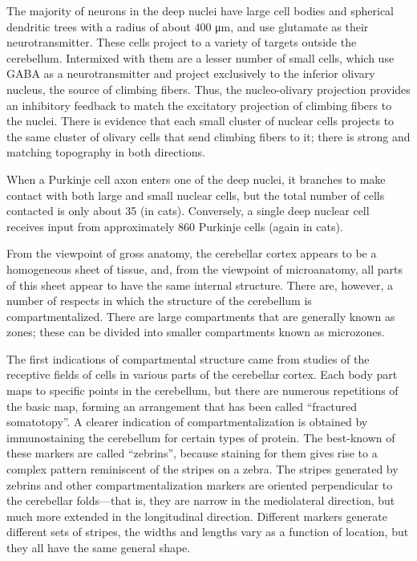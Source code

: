 \documentclass[]{book}
\begin{document}
The majority of neurons in the deep nuclei have large cell bodies and spherical dendritic trees with a radius of about 400 μm, and use glutamate as their neurotransmitter. These cells project to a variety of targets outside the cerebellum. Intermixed with them are a lesser number of small cells, which use GABA as a neurotransmitter and project exclusively to the inferior olivary nucleus, the source of climbing fibers. Thus, the nucleo-olivary projection provides an inhibitory feedback to match the excitatory projection of climbing fibers to the nuclei. There is evidence that each small cluster of nuclear cells projects to the same cluster of olivary cells that send climbing fibers to it; there is strong and matching topography in both directions.

When a Purkinje cell axon enters one of the deep nuclei, it branches to make contact with both large and small nuclear cells, but the total number of cells contacted is only about 35 (in cats). Conversely, a single deep nuclear cell receives input from approximately 860 Purkinje cells (again in cats).

From the viewpoint of gross anatomy, the cerebellar cortex appears to be a homogeneous sheet of tissue, and, from the viewpoint of microanatomy, all parts of this sheet appear to have the same internal structure. There are, however, a number of respects in which the structure of the cerebellum is compartmentalized. There are large compartments that are generally known as zones; these can be divided into smaller compartments known as microzones.

The first indications of compartmental structure came from studies of the receptive fields of cells in various parts of the cerebellar cortex. Each body part maps to specific points in the cerebellum, but there are numerous repetitions of the basic map, forming an arrangement that has been called ``fractured somatotopy''. A clearer indication of compartmentalization is obtained by immunostaining the cerebellum for certain types of protein. The best-known of these markers are called ``zebrins'', because staining for them gives rise to a complex pattern reminiscent of the stripes on a zebra. The stripes generated by zebrins and other compartmentalization markers are oriented perpendicular to the cerebellar folds---that is, they are narrow in the mediolateral direction, but much more extended in the longitudinal direction. Different markers generate different sets of stripes, the widths and lengths vary as a function of location, but they all have the same general shape.
\end{document}
